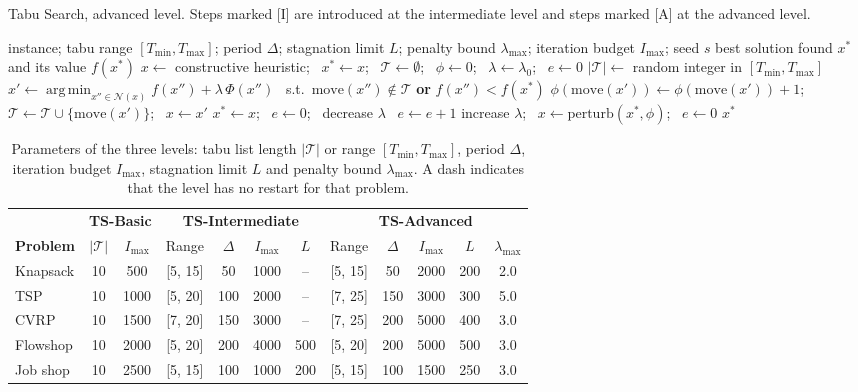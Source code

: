 \documentclass[engproc,proceedingpaper,submit,moreauthors]{Definitions/mdpi}
\DeclareMathOperator*{\argmin}{arg\,min}
\begin{document}
\begin{algorithm}[H]
\caption{Tabu Search, advanced level. Steps marked [I] are introduced at the intermediate level and steps marked [A] at the advanced level.}\label{alg:ts}
\small
\begin{algorithmic}[1]
\Require instance; tabu range $[T_{\min}, T_{\max}]$; period $\Delta$; stagnation limit $L$; penalty bound $\lambda_{\max}$; iteration budget $I_{\max}$; seed $s$
\Ensure best solution found $x^{*}$ and its value $f(x^{*})$
\State $x \leftarrow$ constructive heuristic; \ $x^{*} \leftarrow x$; \ $\mathcal{T} \leftarrow \emptyset$; \ $\phi \leftarrow 0$; \ $\lambda \leftarrow \lambda_{0}$; \ $e \leftarrow 0$
 $|\mathcal{T}| \leftarrow$ random integer in $[T_{\min}, T_{\max}]$ 
\EndIf
\State $x' \leftarrow \argmin_{x'' \in \mathcal{N}(x)} f(x'') + \lambda \, \Phi(x'')$ \ s.t.\ $\mathrm{move}(x'') \notin \mathcal{T}$ \textbf{or} $f(x'') < f(x^{*})$ 
\State $\phi(\mathrm{move}(x')) \leftarrow \phi(\mathrm{move}(x')) + 1$; \ $\mathcal{T} \leftarrow \mathcal{T} \cup \{\mathrm{move}(x')\}$; \ $x \leftarrow x'$ 
 $x^{*} \leftarrow x$; \ $e \leftarrow 0$; \ decrease $\lambda$ 
\Else \ $e \leftarrow e + 1$
\EndIf
{} increase $\lambda$; \ $x \leftarrow \mathrm{perturb}(x^{*}, \phi)$; \ $e \leftarrow 0$ 
\EndIf
\EndFor
\State \Return $x^{*}$
\end{algorithmic}
\end{algorithm}

\begin{table}[H]
\caption{Parameters of the three levels: tabu list length $|\mathcal{T}|$ or range $[T_{\min}, T_{\max}]$, period $\Delta$, iteration budget $I_{\max}$, stagnation limit $L$ and penalty bound $\lambda_{\max}$. A dash indicates that the level has no restart for that problem.\label{tab:params}}
\small
\begin{tabularx}{\textwidth}{@{}l cc cccc ccccc@{}}
\toprule
 & \multicolumn{2}{c}{\textbf{TS-Basic}} & \multicolumn{4}{c}{\textbf{TS-Intermediate}} & \multicolumn{5}{c}{\textbf{TS-Advanced}}\\
\cmidrule(lr){2-3}\cmidrule(lr){4-7}\cmidrule(l){8-12}
\textbf{Problem} & $|\mathcal{T}|$ & $I_{\max}$ & Range & $\Delta$ & $I_{\max}$ & $L$ & Range & $\Delta$ & $I_{\max}$ & $L$ & $\lambda_{\max}$\\
\midrule
Knapsack & 10 & 500  & [5, 15] & 50  & 1000 & --  & [5, 15] & 50  & 2000 & 200 & 2.0\\
TSP      & 10 & 1000 & [5, 20] & 100 & 2000 & --  & [7, 25] & 150 & 3000 & 300 & 5.0\\
CVRP     & 10 & 1500 & [7, 20] & 150 & 3000 & --  & [7, 25] & 200 & 5000 & 400 & 3.0\\
Flowshop & 10 & 2000 & [5, 20] & 200 & 4000 & 500 & [5, 20] & 200 & 5000 & 500 & 3.0\\
Job shop & 10 & 2500 & [5, 15] & 100 & 1000 & 200 & [5, 15] & 100 & 1500 & 250 & 3.0\\
\bottomrule
\end{tabularx}
\end{table}
\end{document}
